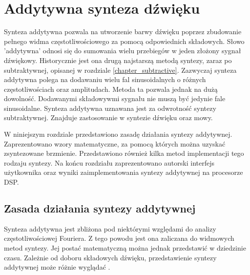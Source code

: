 \chapter{Addytywna synteza dźwięku}\label{chapter_additive}
Synteza addytywna pozwala na utworzenie barwy dźwięku poprzez zbudowanie pełnego widma częstotliwościowego za pomocą odpowiednich składowych. Słowo 'addytywna' odnosi się do sumowania wielu przebiegów w jeden złożony sygnał dźwiękowy. Historycznie jest ona drugą najstarszą metodą syntezy, zaraz po subtraktywnej, opisanej w rozdziale \ref{chapter_subtractive}.
Zazwyczaj synteza addytywna polega na dodawaniu wielu fal sinusoidalnych o różnych częstotliwościach oraz amplitudach. Metoda ta pozwala jednak na dużą dowolność. Dodawanymi składowywmi sygnału nie muszą być jedynie fale sinusoidalne.
Synteza addytywna uznawana jest za odwrotność syntezy subtraktywnej. Znajduje zastosowanie w syntezie dźwięku oraz mowy.

W niniejszym rozdziale przedstawiono zasadę działania syntezy addytywnej. Zaprezentowano wzory matematyczne, za pomocą których można uzyskać zsyntezowane brzmienie. Przedstawiono również kilka metod implementacji tego rodzaju syntezy. Na końcu rozdziału zaprezentowano autorski interfejs użytkownika oraz wyniki zaimplementowania syntezy addytywnej na procesorze DSP.

\section{Zasada działania syntezy addytywnej}
Synteza addytywna jest zbliżona pod niektórymi względami do analizy częstotliwościowej Fouriera. Z tego powodu jest ona zaliczana do widmowych metod syntezy. Jej postać matematyczną można jednak przedstawić w dziedzinie czasu. Zależnie od doboru składowych dźwięku, przedstawienie syntezy addytywnej może różnie wyglądać \cite{add_defins}.

